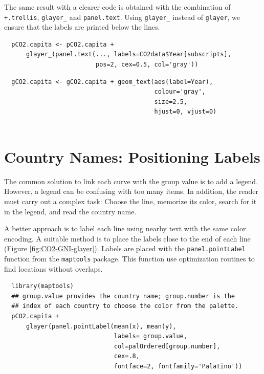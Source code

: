 \documentclass[smallroyalvopaper]{memoir}
\begin{document}
The same result with a clearer code is obtained with the combination
of \texttt{+.trellis}, \texttt{glayer\_} and \texttt{panel.text}. Using \texttt{glayer\_} instead of
\texttt{glayer}, we ensure that the labels are printed below the lines.


\lstset{language=r,label= ,caption= ,captionpos=b,numbers=none}
\begin{lstlisting}
  pCO2.capita <- pCO2.capita +
      glayer_(panel.text(..., labels=CO2data$Year[subscripts],
                         pos=2, cex=0.5, col='gray'))
\end{lstlisting}

\lstset{language=r,label= ,caption= ,captionpos=b,numbers=none}
\begin{lstlisting}
  gCO2.capita <- gCO2.capita + geom_text(aes(label=Year),
                                         colour='gray',
                                         size=2.5,
                                         hjust=0, vjust=0)
  
\end{lstlisting}

\section{Country Names: Positioning Labels}
\label{sec:org45c0d39}
The common solution to link each curve with the group value is to add
a legend. However, a legend can be confusing with too many items. In
addition, the reader must carry out a complex task: Choose the line,
memorize its color, search for it in the legend, and read the country
name.

A better approach is to label each line using nearby text with the
same color encoding. A suitable method is to place the labels
close to the end of each line (Figure
\ref{fig:CO2-GNI-glayer}). Labels are placed with the
\texttt{panel.pointLabel} function from the \texttt{maptools} package. This
function use optimization routines to find locations without
overlaps.


\lstset{language=r,label= ,caption= ,captionpos=b,numbers=none}
\begin{lstlisting}
  library(maptools)  
  ## group.value provides the country name; group.number is the
  ## index of each country to choose the color from the palette.
  pCO2.capita +
      glayer(panel.pointLabel(mean(x), mean(y),
                              labels= group.value,
                              col=palOrdered[group.number],
                              cex=.8,
                              fontface=2, fontfamily='Palatino'))
\end{lstlisting}
\end{document}
